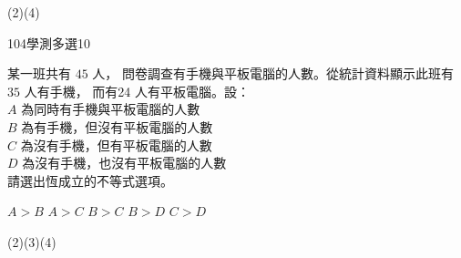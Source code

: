 \begin{QUESTIONS}
\begin{QUESTION}
\begin{QBODY}
        \end{QBODY}
        \begin{QFROMS}
        \end{QFROMS}
        \begin{QTAGS}\end{QTAGS}
        \begin{QANS}
            (2)(4)
        \end{QANS}
        \begin{QSOLLIST}
        \end{QSOLLIST}
        \begin{QEMPTYSPACE}
        \end{QEMPTYSPACE}
    \end{QUESTION}
    \begin{QUESTION}
        \begin{ExamInfo}{104}{學測}{多選}{10}
        \end{ExamInfo}
        \begin{ExamAnsRateInfo}{45}{64}{42}{29}
        \end{ExamAnsRateInfo}
        \begin{QBODY}
            某一班共有 $45$ 人， 問卷調查有手機與平板電腦的人數。從統計資料顯示此班有 $35$ 人有手機， 而有24 人有平板電腦。設：\\
				$A$ 為同時有手機與平板電腦的人數\\
				$B$ 為有手機，但沒有平板電腦的人數\\
				$C$ 為沒有手機，但有平板電腦的人數\\
				$D$ 為沒有手機，也沒有平板電腦的人數\\
			請選出恆成立的不等式選項。
			\begin{QOPSINONELINE}
				\QOP $A>B$	\QOP $A>C$	\QOP $B>C$	\QOP $B>D$	\QOP $C>D$
			\end{QOPSINONELINE}
        \end{QBODY}
        \begin{QFROMS}
        \end{QFROMS}
        \begin{QTAGS}\end{QTAGS}
        \begin{QANS}
            (2)(3)(4)
        \end{QANS}
        \begin{QSOLLIST}
            \begin{QSOL}[SOLID=14]
			\end{QSOL}

        \end{QSOLLIST}
        \begin{QEMPTYSPACE}
        \end{QEMPTYSPACE}
    \end{QUESTION}
\end{QUESTIONS}

